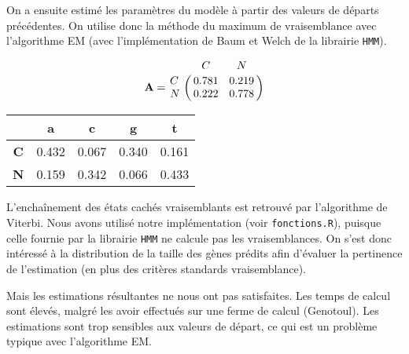 \documentclass[12pt,a4paper]{article}
\begin{document}
On a ensuite estimé les paramètres du modèle à partir des valeurs de départs précédentes.
On utilise donc la méthode du maximum de vraisemblance avec l'algorithme EM (avec l'implémentation de Baum et Welch de la librairie \verb+HMM+).


\[
	\mathbf{A} = 
\bordermatrix{~ & C & N \cr
C & 0.781 & 0.219\cr
N & 0.222 & 0.778\cr}
\]

\begin{table}[!h]
	\centering
	\begin{tabular}{ccccc}
		& \textbf{a} & \textbf{c} & \textbf{g} & \textbf{t}\\
	\hline
	\textbf{C} &0.432 & 0.067 & 0.340 & 0.161\\ 
	\textbf{N} &0.159 & 0.342 & 0.066 & 0.433\\ 
	\hline
\end{tabular}
\end{table}

L'enchaînement des états cachés vraisemblants est retrouvé par l'algorithme de Viterbi.
Nous avons utilisé notre implémentation (voir \verb+fonctions.R+), puisque celle fournie par la librairie \verb+HMM+ ne calcule pas les vraisemblances.
On s'est donc intéressé à la distribution de la taille des gènes prédits afin d'évaluer la pertinence de l'estimation (en plus des critères standards vraisemblance).


Mais les estimations résultantes ne nous ont pas satisfaites.
Les temps de calcul sont élevés, malgré les avoir effectués sur une ferme de calcul (Genotoul).
Les estimations sont trop sensibles aux valeurs de départ, ce qui est un problème typique avec l'algorithme EM.

\end{document}
